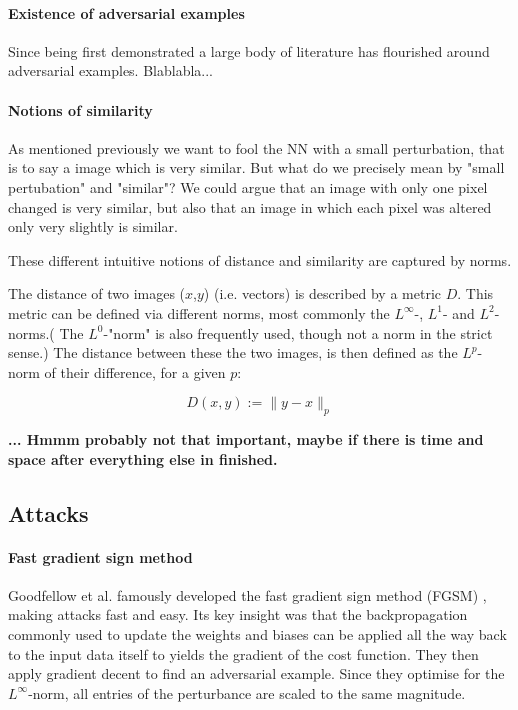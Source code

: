 \documentclass{article}
\begin{document}
\paragraph{Existence of adversarial examples}
Since being first demonstrated \cite{Szegedy13} a large body of literature has flourished around adversarial examples. Blablabla...

\paragraph{Notions of similarity}
As mentioned previously we want to fool the NN with a small perturbation, that is to say a image which is very similar. But what do we precisely mean by "small pertubation" and "similar"? We could argue that an image with only one pixel changed is very similar, but also that an image in which each pixel was altered only very slightly is similar.

These different intuitive notions of distance and similarity are captured by norms.

The distance of two images ($x$,$y$) (i.e. vectors) is described by a metric $D$. This metric can be defined via different norms, most commonly the $L^\infty$-, $L^1$- and $L^2$-norms.( The $L^0$-"norm" is also frequently used, though not a norm in the strict sense.) The distance between these the two images, is then defined as the $L^p$-norm of their difference, for a given $p$:

\begin{equation}
	D(x,y) := \| y - x \|_p
\end{equation}


\textbf{... Hmmm probably not that important, maybe if there is time and space after everything else in finished.}

\subsection{Attacks}

\paragraph{Fast gradient sign method}
Goodfellow et al. famously developed the fast gradient sign method (FGSM) \cite{goodfellow2014explaining}, making attacks fast and easy. Its key insight was that the backpropagation commonly used to update the weights and biases can be applied all the way back to the input data itself to yields the gradient of the cost function. They then apply gradient decent to find an adversarial example. Since they optimise for the $L^\infty$-norm, all entries of the perturbance are scaled to the same magnitude.
\end{document}
